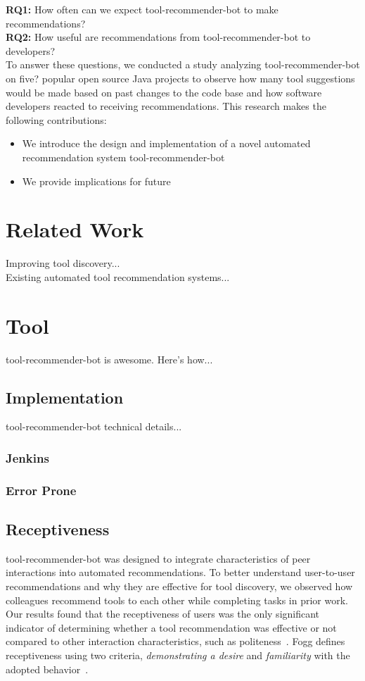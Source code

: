 \documentclass[conference]{IEEEtran}
\newcommand{\tool}{tool-recommender-bot }
\begin{document}
\noindent
\textbf{RQ1:} How often can we expect \tool to make recommendations?  \\
\textbf{RQ2:} How useful are recommendations from \tool to developers?  \\

To answer these questions, we conducted a study analyzing \tool on five? popular open source Java projects to observe how many tool suggestions would be made based on past changes to the code base and how software developers reacted to receiving recommendations. This research makes the following contributions:\\

\begin{itemize}
\item We introduce the design and implementation of a novel automated recommendation system \tool
\item We provide implications for future
\end{itemize}

\section{Related Work}

Improving tool discovery...\\

Existing automated tool recommendation systems...

\section{Tool}
\tool is awesome. Here's how...

\subsection{Implementation}
\tool technical details...

\subsubsection{Jenkins}

\subsubsection{Error Prone}

\subsection{Receptiveness}
\tool was designed to integrate characteristics of peer interactions into automated recommendations. To better understand user-to-user recommendations and why they are effective for tool discovery, we observed how colleagues recommend tools to each other while completing tasks in prior work. Our results found that the receptiveness of users was the only significant indicator of determining whether a tool recommendation was effective or not compared to other interaction characteristics, such as politeness~\cite{vlhcc17}. Fogg defines receptiveness using two criteria, \textit{demonstrating a desire} and \textit{familiarity} with the adopted behavior~\cite{FoggPersuasive}.
\end{document}
